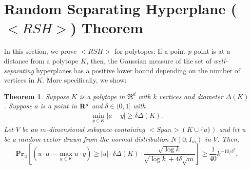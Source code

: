 \documentclass[11pt,letterpaper]{article}
\newcounter{note}[section]
\def\mathsf#1{<#1>}%
\def\xspace{}%
\def\Cref#1{<Label:#1>}%
\def\eqref#1{<Eq.:#1>}%
\newtheorem{theorem}{Theorem}[section]
\theoremstyle{definition}
\theoremstyle{remark}
\newcommand{\prob}{{\mathbf{Pr}}}
\newcommand{\lspan}{{\mathsf{Span}}}
\newcommand{\dia}{\Delta}
\newcommand{\rsh}{{\mathsf {RSH}}\xspace}
\begin{document}
\section{Random Separating Hyperplane ($\rsh$) Theorem}
\label{sec:rsh}
In this section, we prove $\rsh$ for polytopes: If a point $p$  point is at a distance from a polytope $K$, then, the Gaussian measure of the set of {\em well-separating} hyperplanes has a positive lower bound depending on the number of vertices in $K$. More specifically, we show:

\begin{theorem}
\label{thm:sephp}
Suppose $K$ is a polytope in $\Re^d$ with $k$ vertices and diameter $\dia(K)$. Suppose  $a$ is a point in ${\bf R}^d$ and $\delta\in (0,1]$ with
\begin{align}
\label{eq:condhp}
\min_{y\in K} |a-y|\geq\delta \dia(K).
\end{align}
Let $V$ be an $m$-dimensional subspace containing $\lspan(K\cup \{ a\})$ and let $u$ be a random vector drawn from the normal distribution $N(0, I_m)$ in $V$. 
Then,
$$\prob_u\left[ (u\cdot a-\max_{y\in K}u\cdot y) \geq  |u| \cdot \delta \dia(K) \cdot \frac{\sqrt{\log k}}{\sqrt{\log k} + 4 \delta \sqrt{m}} \right]\geq
            \frac{1}{40}    k^{-10/\delta^2}.$$
\end{theorem}          

\end{document}
